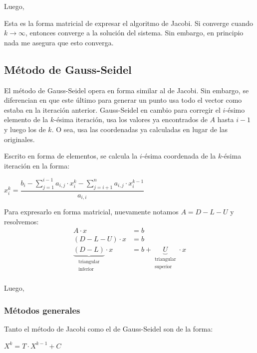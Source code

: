 \documentclass[]{article}
\begin{document}
Luego,

Esta es la forma matricial de expresar el algoritmo de Jacobi. Si converge cuando $k\rightarrow\infty$, entonces converge a la solución del sistema. Sin embargo, en principio nada me asegura que esto converga.

\subsection{Método de Gauss-Seidel}
El método de Gauss-Seidel opera en forma similar al de Jacobi. Sin embargo, se diferencian en que este último para generar un punto usa todo el vector como estaba en la iteración anterior. Gauss-Seidel en cambio para corregir el $i$-ésimo elemento de la $k$-ésima iteración, usa los valores ya encontrados de $A$ hasta $i-1$ y luego los de $k$. O sea, usa las coordenadas ya calculadas en lugar de las originales.

Escrito en forma de elementos, se calcula la $i$-ésima coordenada de la $k$-ésima iteración en la forma:
\begin{center}
	$x_i^k = \dfrac{\displaystyle b_i - \sum_{j=1}^{i-1}{a_{i,j}\cdot x_i^k} - \sum_{j=i+1}^{n}{a_{i,j}\cdot x_i^{k-1}}}{a_{i,i}}$
\end{center}

Para expresarlo en forma matricial, nuevamente notamos $A=D-L-U$ y resolvemos:
\begin{align*}
	A\cdot x&=b\\
	(D-L-U)\cdot x &= b\\
	\underbrace{(D-L)}_{\substack{\text{triangular}\\\text{inferior}}}\cdot x &= b+\underbrace{U}_{\substack{\text{triangular}\\\text{superior}}}\cdot x\\
\end{align*}

Luego,

\subsubsection{Métodos generales}
Tanto el método de Jacobi como el de Gauss-Seidel son de la forma:
\begin{center}
	$X^k = T\cdot X^{k-1} + C$
\end{center}

\end{document}
